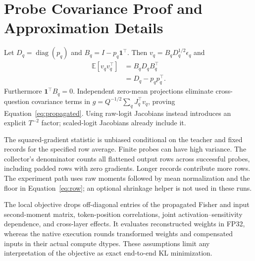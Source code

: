 \documentclass[10pt,twocolumn]{article}
\newcommand{\E}{\mathbb E}
\newcommand{\diag}{\operatorname{diag}}
\begin{document}
\clearpage\appendix
\section{Probe Covariance Proof and Approximation Details}
\label{app:proof}
Let $D_q=\diag(p_q)$ and $B_q=I-p_q\mathbf 1^\top$.
Then $v_q=B_qD_q^{1/2}\epsilon_q$ and
\begin{align}
 \E[v_qv_q^\top]&=B_qD_qB_q^\top\\
 &=D_q-p_qp_q^\top .
\end{align}
Furthermore $\mathbf 1^\top B_q=0$. Independent zero-mean projections
eliminate cross-question covariance terms in
$g=Q^{-1/2}\sum_qJ_q^\top v_q$, proving Equation~\eqref{eq:propagated}.
Using raw-logit Jacobians instead introduces an explicit
$T^{-2}$ factor; scaled-logit Jacobians already include it.

The squared-gradient statistic is unbiased conditional on the
teacher and fixed records for the specified row average. Finite probes
can have high variance. The collector's denominator counts all
flattened output rows across successful probes, including padded rows
with zero gradients. Longer records contribute more rows.
The experiment path uses raw moments followed by mean normalization
and the floor in Equation~\eqref{eq:row}; an optional shrinkage helper
is not used in these runs.

The local objective drops off-diagonal entries of the
propagated Fisher and input second-moment matrix, token-position
correlations, joint activation--sensitivity dependence, and cross-layer
effects. It evaluates reconstructed weights in FP32, whereas the
native execution rounds transformed weights and compensated inputs
in their actual compute dtypes. These assumptions limit any
interpretation of the objective as exact end-to-end KL minimization.
\end{document}
